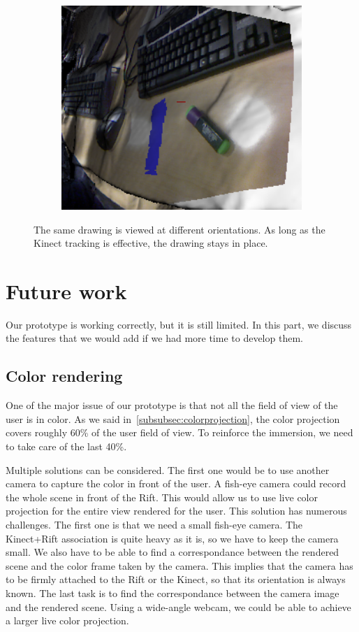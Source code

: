 \documentclass[12pt, twoside]{article}
\let\oldsection\section
\def\section{\cleardoublepage\oldsection}
\begin{document}
\begin{figure}[h]
\begin{subfigure}[t]{0.5\textwidth}
    \includegraphics[width=1\textwidth]{Orientation3.png}
    \caption{}
    \end{subfigure}
  \caption{\label{fig:orientation} The same drawing is viewed at different orientations. As long as the Kinect tracking is effective, the drawing stays in place.}
  
\end{figure}

\newpage
\section{Future work}
Our prototype is working correctly, but it is still limited. In this part, we discuss the features that we would add if we had more time to develop them.
\subsection{Color rendering}
One of the major issue of our prototype is that not all the field of view of the user is in color. As we said in~\ref{subsubsec:colorprojection}, the color projection covers roughly 60\% of the user field of view. To reinforce the immersion, we need to take care of the last 40\%.

Multiple solutions can be considered. The first one would be to use another camera to capture the color in front of the user. A fish-eye camera could record the whole scene in front of the Rift. This would allow us to use live color projection for the entire view rendered for the user. This solution has numerous challenges. The first one is that we need a small fish-eye camera. The Kinect+Rift association is quite heavy as it is, so we have to keep the camera small. We also have to be able to find a correspondance between the rendered scene and the color frame taken by the camera. This implies that the camera has to be firmly attached to the Rift or the Kinect, so that its orientation is always known. The last task is to find the correspondance between the camera image and the rendered scene. Using a wide-angle webcam, we could be able to achieve a larger live color projection.
\end{document}
